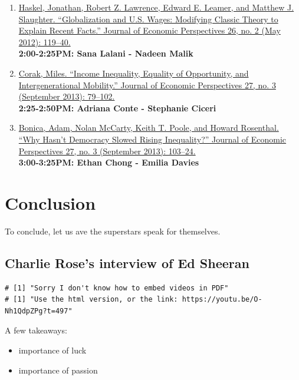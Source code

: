 \documentclass[]{book}
\providecommand{\tightlist}{%
  \setlength{\itemsep}{0pt}\setlength{\parskip}{0pt}}
\theoremstyle{definition}
\theoremstyle{definition}
\theoremstyle{definition}
\theoremstyle{remark}
\begin{document}
\begin{enumerate}
\def\labelenumi{\arabic{enumi}.}
\setcounter{enumi}{4}
\item
  \href{https://doi.org/10.1257/jep.26.2.119}{Haskel, Jonathan, Robert
  Z. Lawrence, Edward E. Leamer, and Matthew J. Slaughter.
  ``Globalization and U.S. Wages: Modifying Classic Theory to Explain
  Recent Facts.'' Journal of Economic Perspectives 26, no. 2 (May 2012):
  119--40.}\\
  \textbf{2:00-2:25PM: Sana Lalani - Nadeen Malik}
\item
  \href{https://doi.org/10.1257/jep.27.3.79}{Corak, Miles. ``Income
  Inequality, Equality of Opportunity, and Intergenerational Mobility.''
  Journal of Economic Perspectives 27, no. 3 (September 2013):
  79--102.}\\
  \textbf{2:25-2:50PM: Adriana Conte - Stephanie Ciceri}
\item
  \href{https://doi.org/10.1257/jep.27.3.103}{Bonica, Adam, Nolan
  McCarty, Keith T. Poole, and Howard Rosenthal. ``Why Hasn't Democracy
  Slowed Rising Inequality?'' Journal of Economic Perspectives 27, no. 3
  (September 2013): 103--24.}\\
  \textbf{3:00-3:25PM: Ethan Chong - Emilia Davies}
\end{enumerate}

\chapter{Conclusion}\label{concluding-superstars}

To conclude, let us ave the superstars speak for themselves.

\section{Charlie Rose's interview of Ed
Sheeran}\label{charlie-roses-interview-of-ed-sheeran}

\begin{verbatim}
# [1] "Sorry I don't know how to embed videos in PDF"
# [1] "Use the html version, or the link: https://youtu.be/O-Nh1QdpZPg?t=497"
\end{verbatim}

A few takeaways:

\begin{itemize}
\tightlist
\item
  importance of luck
\item
  importance of passion
\end{itemize}
\end{document}
